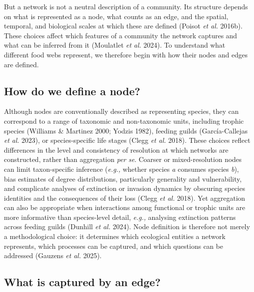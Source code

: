 \documentclass[
]{article}
\begin{document}
But a network is not a neutral description of a community. Its structure
depends on what is represented as a node, what counts as an edge, and
the spatial, temporal, and biological scales at which these are defined
(Poisot \emph{et al.} 2016b). These choices affect which features of a
community the network captures and what can be inferred from it
(Moulatlet \emph{et al.} 2024). To understand what different food webs
represent, we therefore begin with how their nodes and edges are
defined.

\subsection{How do we define a node?}\label{how-do-we-define-a-node}

Although nodes are conventionally described as representing species,
they can correspond to a range of taxonomic and non-taxonomic units,
including trophic species (Williams \& Martinez 2000; Yodzis 1982),
feeding guilds (García-Callejas \emph{et al.} 2023), or species-specific
life stages (Clegg \emph{et al.} 2018). These choices reflect
differences in the level and consistency of resolution at which networks
are constructed, rather than aggregation \emph{per se}. Coarser or
mixed-resolution nodes can limit taxon-specific inference (\emph{e.g.,}
whether species \emph{a} consumes species \emph{b}), bias estimates of
degree distributions, particularly generality and vulnerability, and
complicate analyses of extinction or invasion dynamics by obscuring
species identities and the consequences of their loss (Clegg \emph{et
al.} 2018). Yet aggregation can also be appropriate when interactions
among functional or trophic units are more informative than
species-level detail, \emph{e.g.,} analysing extinction patterns across
feeding guilds (Dunhill \emph{et al.} 2024). Node definition is
therefore not merely a methodological choice: it determines which
ecological entities a network represents, which processes can be
captured, and which questions can be addressed (Gauzens \emph{et al.}
2025).

\subsection{What is captured by an edge?}\label{sec-edge}
\end{document}
